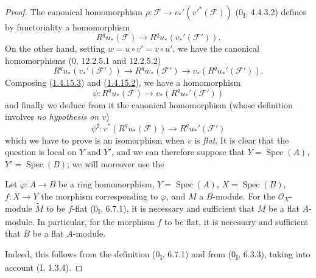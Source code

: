 \begin{proof}
The canonical homomorphism
$\rho:\mathcal F\to v_*'(v'^*(\mathcal F))$ (0\textsubscript{I}, 4.4.3.2)
defines by functoriality a homomorphism
\begin{equation}
\label{III.1.4.15.2}
\tag{1.4.15.2}
R^qu_*(\mathcal F)\longrightarrow R^qu_*(v_*'(\mathcal F')).
\end{equation}
On the other hand, setting $w=u\circ v'=v\circ u'$, we have the
canonical homomorphisms (0, 12.2.5.1 and 12.2.5.2)
\begin{equation}
\label{III.1.4.15.3}
\tag{1.4.15.3}
R^qu_*(v_*'(\mathcal F'))\longrightarrow R^qw_*(\mathcal F')
\longrightarrow v_*(R^qu_*'(\mathcal F')).
\end{equation}
Composing (\hyperref[III.1.4.15.3]{1.4.15.3}) and
(\hyperref[III.1.4.15.2]{1.4.15.2}), we have a homomorphism
\[
\psi:R^qu_*(\mathcal F)\longrightarrow v_*(R^qu_*'(\mathcal F'))
\]
and finally we deduce from it the canonical homomorphism (whose definition
involves \emph{no hypothesis on $v$})
\begin{equation}
\label{III.1.4.15.4}
\tag{1.4.15.4}
\psi^\sharp:v^*(R^qu_*(\mathcal F))\longrightarrow R^qu_*'(\mathcal F')
\end{equation}
which we have to prove is an isomorphism when $v$ is
\emph{flat}. It is clear that the question is local on $Y$ and $Y'$, and we
can therefore suppose that $Y=\operatorname{Spec}(A)$,
$Y'=\operatorname{Spec}(B)$; we will moreover use the

\begin{lemma}[1.4.15.5]
\label{III.1.4.15.5}
Let $\varphi:A\to B$ be a ring homomorphism,
$Y=\operatorname{Spec}(A)$, $X=\operatorname{Spec}(B)$,
$f:X\to Y$ the morphism corresponding to $\varphi$, and $M$ a $B$-module.
For the $\mathcal O_X$-module $\widetilde M$ to be $f$-flat
(0\textsubscript{I}, 6.7.1), it is necessary and sufficient that $M$ be a
flat $A$-module. In particular, for the morphism $f$ to be flat, it is
necessary and sufficient that $B$ be a flat $A$-module.
\end{lemma}

Indeed, this follows from the definition (0\textsubscript{I}, 6.7.1) and
from (0\textsubscript{I}, 6.3.3), taking into account (I, 1.3.4).


\end{proof}
